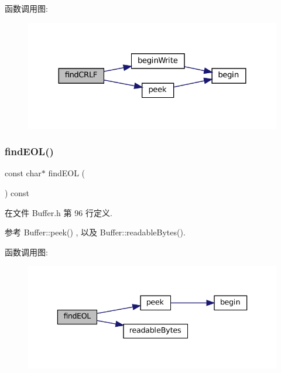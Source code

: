 函数调用图\+:
\nopagebreak
\begin{figure}[H]
\begin{center}
\leavevmode
\includegraphics[width=324pt]{classmuduo_1_1net_1_1Buffer_ac0c8bd8a269f6d31932e0f7bab608fdf_cgraph}
\end{center}
\end{figure}
\mbox{\label{classmuduo_1_1net_1_1Buffer_acf4decda782c75e8f198c95de2958409}} 
\subsubsection{\texorpdfstring{find\+E\+O\+L()}{findEOL()}\hspace{0.1cm}{\footnotesize\ttfamily [1/2]}}
{\footnotesize\ttfamily const char$\ast$ find\+E\+OL (\begin{DoxyParamCaption}{ }\end{DoxyParamCaption}) const\hspace{0.3cm}{\ttfamily [inline]}}



在文件 Buffer.\+h 第 96 行定义.



参考 Buffer\+::peek() , 以及 Buffer\+::readable\+Bytes().

函数调用图\+:
\nopagebreak
\begin{figure}[H]
\begin{center}
\leavevmode
\includegraphics[width=336pt]{classmuduo_1_1net_1_1Buffer_acf4decda782c75e8f198c95de2958409_cgraph}
\end{center}
\end{figure}
\mbox{\label{classmuduo_1_1net_1_1Buffer_a29e5dd77acbc70bc4f98301eb84a29f4}} 
